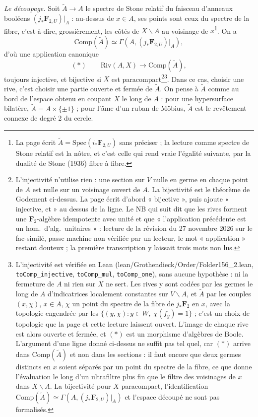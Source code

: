 \documentclass[11pt,a4paper]{article}
\begin{document}
\emph{Le découpage.} Soit $\widetilde{A} \to A$ le spectre de Stone relatif du
faisceau d'anneaux booléens $(j_{*}\mathbf{F}_{2,U})|_{A}$ : au-dessus de $x \in A$,
ses points sont ceux du spectre de la fibre, c'est-à-dire, grossièrement, les côtés
de $X \smallsetminus A$ au voisinage de $x$\footnote{La page écrit $\widetilde{A} =
\mathrm{Spec}(i_{*}\mathbf{F}_{2,U})$ sans préciser ; la lecture comme spectre de
Stone relatif est la nôtre, et c'est celle qui rend vraie l'égalité suivante, par
la dualité de Stone (1936) fibre à fibre.}. On a
\[
\mathrm{Comp}(\widetilde{A}) \simeq \Gamma(A, (j_{*}\mathbf{F}_{2,U})|_{A}),
\]
d'où une application canonique
\[
(*) \qquad \mathrm{Riv}(A,X) \longrightarrow \mathrm{Comp}(\widetilde{A}),
\]
toujours injective, et bijective si $X$ est paracompact\footnote{L'injectivité
n'utilise rien : une section sur $V$ nulle en germe en chaque point de $A$ est
nulle sur un voisinage ouvert de $A$. La bijectivité est le théorème de Godement
ci-dessus. La page écrit d'abord « bijective », puis ajoute « injective, et » au
dessus de la ligne. Le NB qui suit dit que les rives forment une
$\mathbf{F}_{2}$-algèbre idempotente avec unité et que « l'application précédente
est un hom.\ d'alg.\ unitaires » : lecture de la révision du 27 novembre 2026 sur
le fac-similé, passe machine non vérifiée par un lecteur, le mot « application »
restant douteux ; la première transcription y laissait trois mots non lus.}\footnote{L'injectivité est vérifiée en Lean
(lean/Grothendieck/Order/Folder156\_2.lean, \texttt{toComp\_injective},
\texttt{toComp\_mul}, \texttt{toComp\_one}), sans aucune hypothèse : ni la
fermeture de $A$ ni rien sur $X$ ne sert. Les rives y sont codées par les
germes le long de $A$ d'indicatrices localement constantes sur $V \smallsetminus
A$, et $\widetilde{A}$ par les couples $(x, \chi)$, $x \in A$, $\chi$ un point du
spectre de la fibre de $j_{*}\mathbf{F}_{2}$ en $x$, avec la topologie engendrée
par les $\{(y, \chi) : y \in W,\ \chi(f_y) = 1\}$ ; c'est un choix de topologie
que la page et cette lecture laissent ouvert. L'image de chaque rive est alors
ouverte et fermée, et $(*)$ est un morphisme d'algèbres de Boole. L'argument
d'une ligne donné ci-dessus ne suffit pas tel quel, car $(*)$ arrive dans
$\mathrm{Comp}(\widetilde{A})$ et non dans les sections : il faut encore que deux
germes distincts en $x$ soient séparés par un point du spectre de la fibre, ce
que donne l'évaluation le long d'un ultrafiltre plus fin que le filtre des
voisinages de $x$ dans $X \smallsetminus A$. La bijectivité pour $X$
paracompact, l'identification $\mathrm{Comp}(\widetilde{A}) \simeq \Gamma(A,
(j_{*}\mathbf{F}_{2,U})|_{A})$ et l'espace découpé ne sont pas formalisés.}. Dans ce cas, choisir une rive, c'est choisir une partie
ouverte et fermée de $\widetilde{A}$. On pense à $\widetilde{A}$ comme au bord de
l'espace obtenu en coupant $X$ le long de $A$ : pour une hypersurface bilatère,
$\widetilde{A} = A \times \{\pm 1\}$ ; pour l'âme d'un ruban de Möbius,
$\widetilde{A}$ est le revêtement connexe de degré 2 du cercle.
\end{document}
